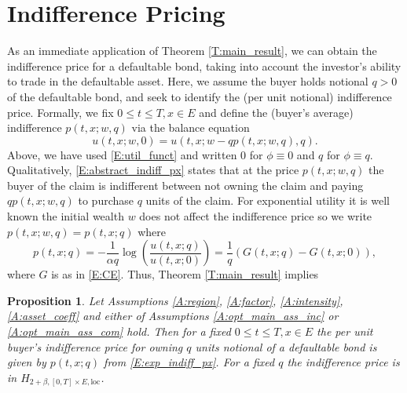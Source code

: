 \documentclass[11pt, letterpaper]{amsart}
\newtheorem{proposition}[theorem]{Proposition}
\theoremstyle{definition}
\theoremstyle{remark}
\numberwithin{equation}{section}
\begin{document}
\section{Indifference Pricing}\label{S:indiff_px}

As an immediate application of Theorem \ref{T:main_result}, we can obtain the indifference price for a defaultable bond, taking into account the investor's ability to trade in the defaultable asset.  Here, we assume the buyer holds notional $q > 0$ of the defaultable bond, and seek to identify the (per unit notional) indifference price.  Formally, we fix $0\leq t\leq T, x\in E$ and define the (buyer's average) indifference $p(t,x;w,q)$ via the balance equation
\begin{equation}\label{E:abstract_indiff_px}
u(t,x;w,0) = u(t,x;w-qp(t,x;w,q),q).
\end{equation}
Above, we have used \eqref{E:util_funct} and written $0$ for $\phi\equiv 0$ and $q$ for $\phi\equiv q$. Qualitatively, \eqref{E:abstract_indiff_px} states that at the price $p(t,x;w,q)$ the buyer of the claim is indifferent between not owning the claim and paying $qp(t,x;w,q)$ to purchase $q$ units of the claim.  For exponential utility it is well known the initial wealth $w$ does not affect the indifference price so we write $p(t,x;w,q) = p(t,x;q)$ where
\begin{equation}\label{E:exp_indiff_px}
p(t,x;q) = -\frac{1}{\alpha q}\log\left(\frac{u(t,x;q)}{u(t,x;0)}\right) = \frac{1}{q}\left(G(t,x;q)-G(t,x;0)\right),
\end{equation}
where $G$ is as in \eqref{E:CE}.  Thus, Theorem \ref{T:main_result} implies

\begin{proposition}\label{P:indiff_px}
Let Assumptions \ref{A:region}, \ref{A:factor}, \ref{A:intensity}, \ref{A:asset_coeff} and either of Assumptions \ref{A:opt_main_ass_inc} or \ref{A:opt_main_ass_com} hold.  Then for a fixed $0\leq t\leq T, x\in E$ the per unit buyer's indifference price for owning $q$ units notional of a defaultable bond is given by $p(t,x;q)$ from \eqref{E:exp_indiff_px}.  For a fixed $q$ the indifference price is in $H_{2+\beta,[0,T]\times E,\textrm{loc}}$.
\end{proposition}
\end{document}
